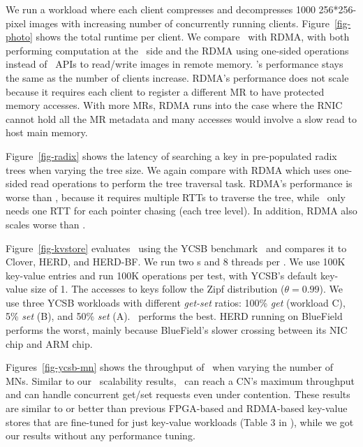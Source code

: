 We run a workload where each client 
compresses and decompresses 1000 256*256-pixel images with increasing number of concurrently running clients.
Figure~\ref{fig-photo} shows the total runtime per client.
We compare \sys\ with RDMA, with both performing computation at the \CN\ side and the RDMA using one-sided operations instead of \sys\ APIs to read/write images in remote memory.
\sys's performance stays the same as the number of clients increase.
RDMA's performance does not scale because it requires each client to register a different MR to have protected memory accesses.
With more MRs, RDMA runs into the case where the RNIC cannot hold all the MR metadata and many accesses would involve a slow read to host main memory.

Figure~\ref{fig-radix} shows the latency of searching a key in pre-populated radix trees when varying the tree size. 
We again compare with RDMA which uses one-sided read operations to perform the tree traversal task.
RDMA's performance is worse than \sys,
because it requires multiple RTTs to traverse the tree,
while \sys\ only needs one RTT for each pointer chasing (each tree level).
In addition, RDMA also scales worse than \sys.

Figure~\ref{fig-kvstore} evaluates \syskv\ using the YCSB benchmark~\cite{YCSB} and compares it to Clover, HERD, and HERD-BF.
We run two \CN{}s and 8 threads per \CN.
We use 100K key-value entries and run 100K operations per test,
with YCSB's default key-value size of 1\KB. %
The accesses to keys follow the Zipf distribution ($\theta=0.99$).
We use three YCSB workloads with different {\em get-set} ratios: 
100\% {\em get} (workload C), 5\% {\em set} (B), and 50\% {\em set} (A).
\syskv\ performs the best.
HERD running on BlueField performs the worst, mainly because BlueField's slower crossing between its NIC chip and ARM chip.




Figures~\ref{fig-ycsb-mn} shows the throughput of \syskv\ when varying the number of MNs. Similar to our
\sys\ scalability results, \syskv\ can reach a CN’s maximum
throughput and can handle concurrent get/set requests even
under contention. These results are similar to or better than
previous FPGA-based and RDMA-based key-value stores that
are fine-tuned for just key-value workloads (Table 3 in \cite{KVDIRECT}),
while we got our results without any performance tuning.

